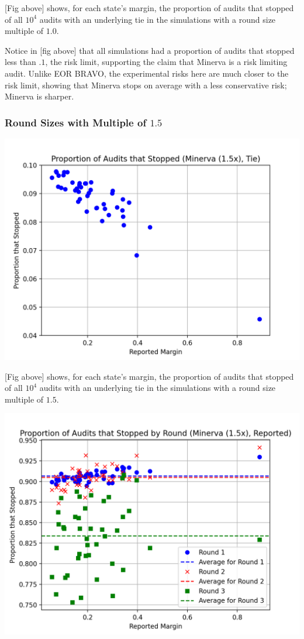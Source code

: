 \documentclass{article}
\begin{document}
[Fig above] shows, for each state's margin, the proportion of audits that stopped of
all $10^4$ audits with an underlying tie in the simulations with a round size multiple of $1.0$.

Notice in [fig above] that all simulations had a proportion of audits that stopped less than $.1$, the risk limit, supporting
the claim that Minerva is a risk limiting audit. 
Unlike EOR BRAVO, the experimental risks here are much closer to the risk limit,
showing that Minerva stops on average with a less conservative risk; Minerva is sharper.

\subsubsection{Round Sizes with Multiple of $1.5$}


\includegraphics[scale=.7]{minerva_multiround_1p5x_10^4/total_risk.png}

[Fig above] shows, for each state's margin, the proportion of audits that stopped of
all $10^4$ audits with an underlying tie in the simulations with a round size multiple of $1.5$.

\includegraphics[scale=.7]{minerva_multiround_1p5x_10^4/sprobs_first_three.png}
\end{document}
